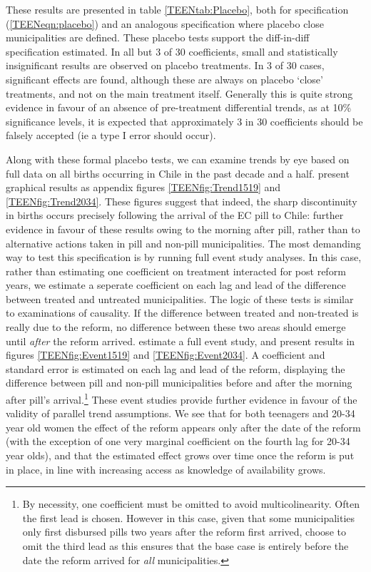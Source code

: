 These results are presented in table \ref{TEENtab:Placebo}, both for 
specification (\ref{TEENeqn:placebo}) and an analogous specification where 
placebo close municipalities are defined.  These placebo tests support the 
diff-in-diff specification estimated.  In all but 3 of 30 coefficients, small
and statistically insignificant results are observed on placebo treatments.  In
3 of 30 cases, significant effects are found, although these are always on 
placebo `close' treatments, and not on the main treatment itself.  Generally
this is quite strong evidence in favour of an absence of pre-treatment 
differential trends, as at 10\% significance levels, it is expected that 
approximately 3 in 30 coefficients should be falsely accepted (ie a type I error
should occur).

Along with these formal placebo tests, we can examine trends by eye based on
full data on all births occurring in Chile in the past decade and a half. \Person 
present graphical results as appendix figures \ref{TEENfig:Trend1519} and 
\ref{TEENfig:Trend2034}.  These figures suggest that indeed, the sharp 
discontinuity in births occurs precisely following the arrival of the EC pill 
to Chile: further evidence in favour of these results owing to the morning after 
pill, rather than to alternative actions taken in pill and non-pill 
municipalities.  The most demanding way to test this specification is by
running full event study analyses.  In this case, rather than estimating one
coefficient on treatment interacted for post reform years, we estimate a 
seperate coefficient on each lag and lead of the difference between treated and
untreated municipalities. The logic of these tests is similar to examinations of
\citet{Granger1969} causality. If the difference between treated and non-treated
is really due to the reform, no difference between these two areas should emerge
until \emph{after} the reform arrived.  \Person estimate a full event study, and
present results in figures \ref{TEENfig:Event1519} and \ref{TEENfig:Event2034}.
A coefficient and standard error is estimated on each lag and lead of the reform, 
displaying the difference between pill and non-pill municipalities before and
after the morning after pill's arrival.\footnote{By necessity, one coefficient
must be omitted to avoid multicolinearity.  Often the first lead is chosen.  
However in this case, given that some municipalities only first disbursed pills
two years after the reform first arrived, \person choose to omit the third lead
as this ensures that the base case is entirely before the date the reform 
arrived for \emph{all} municipalities.}  These event studies provide further
evidence in favour of the validity of parallel trend assumptions.  We see that
for both teenagers and 20-34 year old women the effect of the reform appears
only after the date of the reform (with the exception of one very marginal 
coefficient on the fourth lag for 20-34 year olds), and that the estimated 
effect grows over time once the reform is put in place, in line with increasing
access as knowledge of availability grows.


